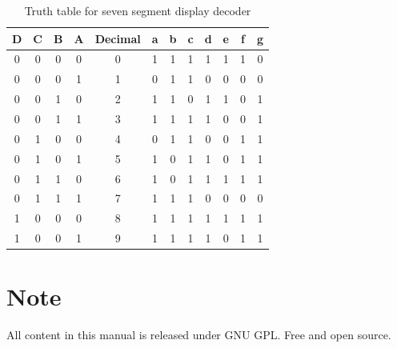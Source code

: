\documentclass[12pt]{article}
\begin{document}
\begin{table}[h!]
\centering
\begin{tabular}{|c|c|c|c|c||c|c|c|c|c|c|c|}
\hline
D & C & B & A & Decimal & a & b & c & d & e & f & g \\
\hline
0 & 0 & 0 & 0 & 0 & 1 & 1 & 1 & 1 & 1 & 1 & 0 \\
0 & 0 & 0 & 1 & 1 & 0 & 1 & 1 & 0 & 0 & 0 & 0 \\
0 & 0 & 1 & 0 & 2 & 1 & 1 & 0 & 1 & 1 & 0 & 1 \\
0 & 0 & 1 & 1 & 3 & 1 & 1 & 1 & 1 & 0 & 0 & 1 \\
0 & 1 & 0 & 0 & 4 & 0 & 1 & 1 & 0 & 0 & 1 & 1 \\
0 & 1 & 0 & 1 & 5 & 1 & 0 & 1 & 1 & 0 & 1 & 1 \\
0 & 1 & 1 & 0 & 6 & 1 & 0 & 1 & 1 & 1 & 1 & 1 \\
0 & 1 & 1 & 1 & 7 & 1 & 1 & 1 & 0 & 0 & 0 & 0 \\
1 & 0 & 0 & 0 & 8 & 1 & 1 & 1 & 1 & 1 & 1 & 1 \\
1 & 0 & 0 & 1 & 9 & 1 & 1 & 1 & 1 & 0 & 1 & 1 \\
\hline
\end{tabular}
\caption{Truth table for seven segment display decoder}
\end{table}

\section*{Note}
All content in this manual is released under GNU GPL. Free and open source.
\end{document}
